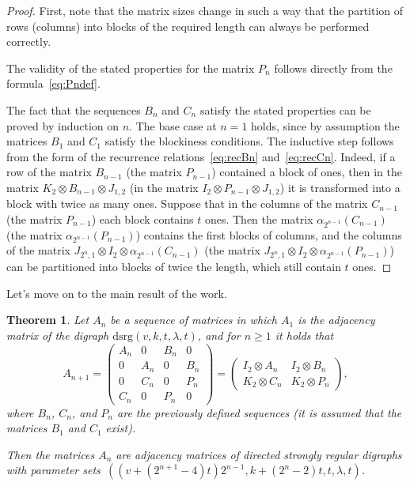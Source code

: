 \documentclass{article}
\newtheorem{theorem}{Theorem}[]
\begin{document}
\begin{proof}
First, note that the matrix sizes change in such a way that the partition of rows (columns) into blocks of the required length can always be performed correctly.

The validity of the stated properties for the matrix $P_n$ follows directly from the formula~\eqref{eq:Pndef}.

The fact that the sequences $B_n$ and $C_n$ satisfy the stated properties can be proved by induction on $n$. The base case at $n=1$ holds, since by assumption the matrices $B_1$ and $C_1$ satisfy the blockiness conditions. The inductive step follows from the form of the recurrence relations~\eqref{eq:recBn} and~\eqref{eq:recCn}. Indeed, if a row of the matrix $B_{n-1}$ (the matrix $P_{n-1}$) contained a block of ones, then in the matrix $K_2 \otimes B_{n-1} \otimes J_{1, 2}$ (in the matrix $I_2 \otimes P_{n-1} \otimes J_{1, 2}$) it is transformed into a block with twice as many ones. Suppose that in the columns of the matrix $C_{n-1}$ (the matrix $P_{n-1}$) each block contains $t$ ones. Then the matrix $\alpha_{2^{n-1}}(C_{n-1})$ (the matrix $\alpha_{2^{n-1}}(P_{n-1})$) contains the first blocks of columns, and the columns of the matrix $J_{2^n, 1} \otimes I_2 \otimes \alpha_{2^{n-1}}(C_{n-1})$ (the matrix $J_{2^n, 1} \otimes I_2 \otimes \alpha_{2^{n-1}}(P_{n-1})$) can be partitioned into blocks of twice the length, which still contain $t$ ones.
\end{proof}

Let's move on to the main result of the work.

\begin{theorem}
\label{th:main}
Let $A_n$ be a sequence of matrices in which $A_1$ is the adjacency matrix of the digraph $\text{dsrg}(v, k, t, \lambda, t)$, and for $n\geqslant 1$ it holds that
\begin{equation}
\label{eq:block_reprAnp1}
A_{n+1} = \left(
\begin{array}{cccc}
A_n & 0 & B_n & 0 \\
0 & A_n & 0 & B_n \\
0 & C_n & 0 & P_n \\
C_n & 0 & P_n & 0
\end{array}
\right)
= \left(
\begin{array}{cc}
I_2\otimes A_n & I_2\otimes B_n \\
K_2\otimes C_n & K_2\otimes P_n
\end{array}
\right)
,
\end{equation}
\noindent where $B_n$, $C_n$, and $P_n$ are the previously defined sequences (it is assumed that the matrices $B_1$ and $C_1$ exist).

Then the matrices $A_n$ are adjacency matrices of directed strongly regular digraphs with parameter sets~\mbox{$((v+(2^{n+1}-4)t)2^{n-1}, k+(2^n-2)t, t, \lambda, t)$}.
\end{theorem}
\end{document}
